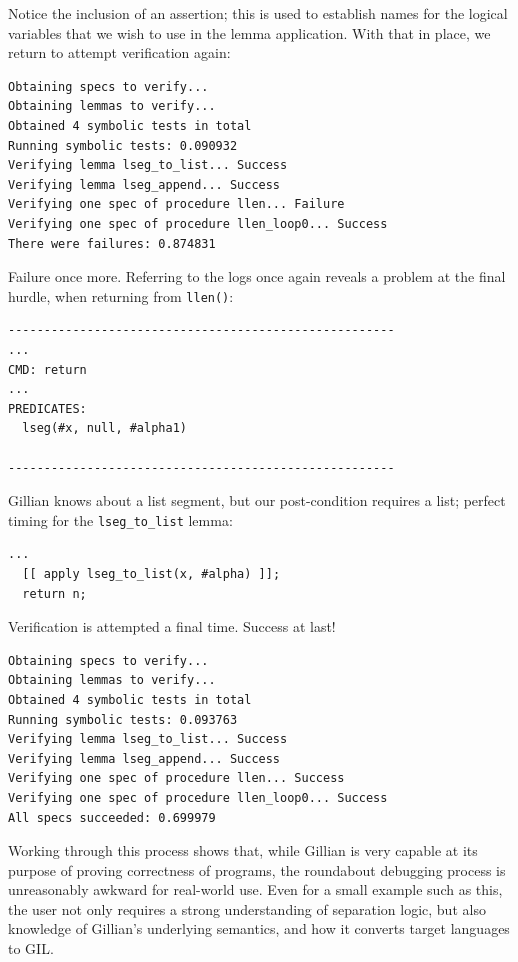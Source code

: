 Notice the inclusion of an assertion; this is used to establish names for the logical variables that we wish to use in the lemma application. With that in place, we return to attempt verification again:

\begin{lstlisting}[style=code, numbers=none, caption={WISL list length - list / list segment error}]
Obtaining specs to verify...
Obtaining lemmas to verify...
Obtained 4 symbolic tests in total
Running symbolic tests: 0.090932
Verifying lemma lseg_to_list... Success
Verifying lemma lseg_append... Success
Verifying one spec of procedure llen... Failure
Verifying one spec of procedure llen_loop0... Success
There were failures: 0.874831
\end{lstlisting}

Failure once more. Referring to the logs once again reveals a problem at the final hurdle, when returning from \texttt{llen()}:

\begin{lstlisting}[numbers=none, caption={WISL list length - list / list segment error, Gillian log file}]
------------------------------------------------------
...
CMD: return
...
PREDICATES:
  lseg(#x, null, #alpha1)

------------------------------------------------------
\end{lstlisting}

Gillian knows about a list segment, but our post-condition requires a list; perfect timing for the \texttt{lseg\_to\_list} lemma:

\begin{lstlisting}[style=code, numbers=none, caption={Applying \texttt{lseg\_to\_list}}]
  ...
  [[ apply lseg_to_list(x, #alpha) ]];
  return n;
\end{lstlisting}

Verification is attempted a final time. Success at last!

\begin{lstlisting}[style=code, numbers=none, caption={Verification: WISL list length success}]
Obtaining specs to verify...
Obtaining lemmas to verify...
Obtained 4 symbolic tests in total
Running symbolic tests: 0.093763
Verifying lemma lseg_to_list... Success
Verifying lemma lseg_append... Success
Verifying one spec of procedure llen... Success
Verifying one spec of procedure llen_loop0... Success
All specs succeeded: 0.699979
\end{lstlisting}

Working through this process shows that, while Gillian is very capable at its purpose of proving correctness of programs, the roundabout debugging process is unreasonably awkward for real-world use. Even for a small example such as this, the user not only requires a strong understanding of separation logic, but also knowledge of Gillian's underlying semantics, and how it converts target languages to GIL.

